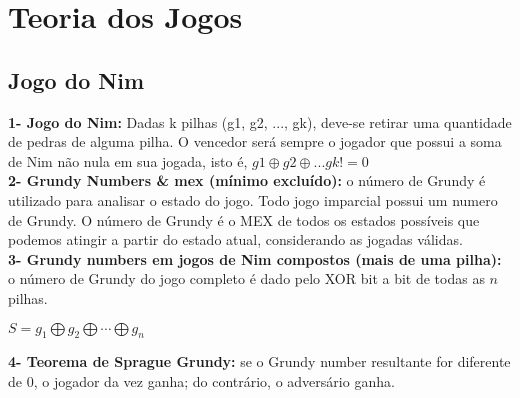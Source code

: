 \section{Teoria dos Jogos}

\subsection{Jogo do Nim}
    \textbf{1- Jogo do Nim:} Dadas k pilhas (g1, g2, ..., gk), deve-se retirar uma quantidade de pedras de alguma pilha. O vencedor será sempre o jogador que possui a soma de Nim não nula em sua jogada, isto é, $g1 \oplus g2 \oplus ... gk != 0$
    \\
    
    \textbf{2- Grundy Numbers \& mex (mínimo excluído):} o número de Grundy é utilizado para analisar o estado do jogo. Todo jogo imparcial possui um numero de Grundy. O número de Grundy é o MEX de todos os estados possíveis que podemos atingir a partir do estado atual, considerando as jogadas válidas.
    \\
    
    \textbf{3- Grundy numbers em jogos de Nim compostos (mais de uma pilha):} o número de Grundy do jogo completo é dado pelo XOR bit a bit de todas as $n$ pilhas.
    \begin{center}
        $S = g_1 \bigoplus g_2 \bigoplus \cdots \bigoplus g_n$
    \end{center}
    
    \textbf{4- Teorema de Sprague Grundy:} se o Grundy number resultante for diferente de 0, o jogador da vez ganha; do contrário, o adversário ganha.
\pagebreak
